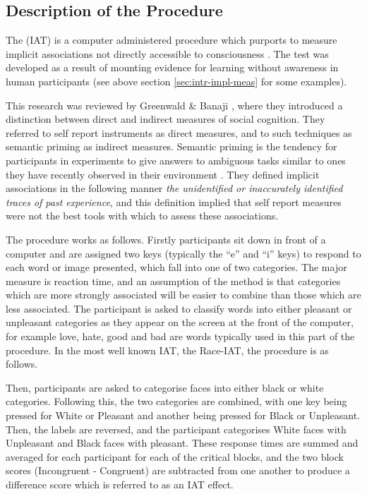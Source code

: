 \subsection{Description of the Procedure}
\label{sec:descr-proc}

The (IAT) is a computer administered procedure which purports to measure implicit associations not directly accessible to consciousness \cite{Greenwald1998}. The test was developed as a result of mounting evidence for learning without awareness in human participants (see above section \ref{sec:intr-impl-meas} for some examples). 

This research was reviewed by Greenwald \& Banaji \cite{Greenwald1995a}, where they introduced a distinction between direct and indirect measures of social cognition. They referred to self report instruments as direct measures, and to such techniques as semantic priming as indirect measures. Semantic priming is the tendency for participants in experiments to give answers to ambiguous tasks similar to ones they have recently observed in their environment \cite{Wittenbrink2007}.  They defined implicit associations in the following manner \textit{the unidentified or inaccurately identified traces of past experience}, and this definition implied that self report measures were not the best tools with which to assess these associations. 

The procedure works as follows. Firstly participants sit down in front of a computer and are assigned two keys (typically the ``e'' and ``i'' keys) to respond to each word or image presented, which fall into one of two categories. The major measure is reaction time, and an assumption of the method is that categories which are more strongly associated will be easier to combine than those which are less associated.  The participant is asked to classify words into either pleasant or unpleasant categories as they appear on the screen at the front of the computer, for example love, hate, good  and bad are words typically used in this part of the procedure. In the most well known IAT, the Race-IAT, the procedure is as follows. 

Then, participants are asked to categorise faces into either black or white categories. Following this, the two categories are combined, with one key being pressed for White or Pleasant and another being pressed for Black or Unpleasant. Then, the labels are reversed, and the participant categorises White faces with Unpleasant and Black faces with pleasant. These response times are summed and averaged for each participant for each of the critical blocks, and the two block scores (Incongruent - Congruent) are subtracted from one another to produce a difference score which is referred to as an IAT effect. 

